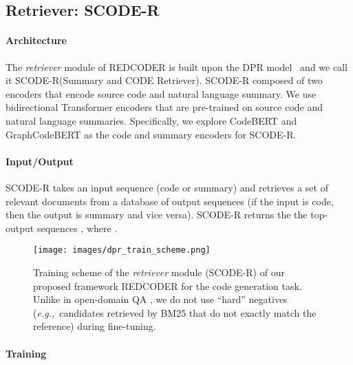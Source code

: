 \documentclass[11pt]{article}
\newcommand{\tool}{{REDCODER}\xspace}
\newcommand{\coder}{SCODE-R\xspace}
\newcommand{\eg}{\textit{e.g.,}~}
\begin{document}
\subsection{Retriever: \coder}
\label{sec:method:ret}
\paragraph{Architecture}
The {\em retriever} module of \tool is built upon the DPR model~\cite{karpukhin-etal-2020-dense} and we call it \coder (Summary and CODE Retriever). 
\coder composed of two encoders that encode source code and natural language summary.
We use bidirectional Transformer encoders \cite{vaswani2017attention} that are pre-trained on source code and natural language summaries.
Specifically, we explore CodeBERT \cite{feng-etal-2020-codebert} and GraphCodeBERT \cite{guo2020graphcodebert} as the code and summary encoders for \coder.







\paragraph{Input/Output} 


\coder takes an input sequence  (code or summary) and retrieves a set of relevant documents from a database of output sequences  (if the input is code, then the output is summary and vice versa).
\coder returns the the top- output sequences , where .



\begin{figure}[!t]
\captionsetup[subfigure]{labelformat=empty}
\centering
\texttt{[image: images/dpr\_train\_scheme.png]}
\caption{
Training scheme of the {\em retriever} module (\coder) of our proposed framework REDCODER  for the code generation task. Unlike in open-domain QA \cite{karpukhin-etal-2020-dense}, we do not use ``hard'' negatives (\eg candidates retrieved by BM25 that do not exactly match the reference) during fine-tuning.
}
\vspace{-2mm}
\label{figure:dpr_train}
\end{figure}



\paragraph{Training}
\end{document}
